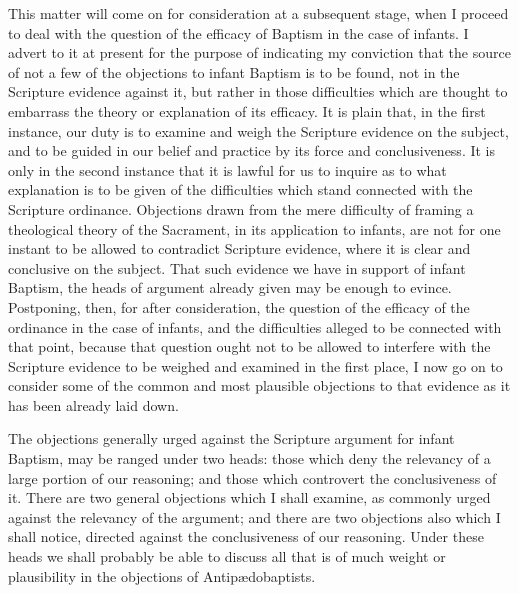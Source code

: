\documentclass[english,]{book}
\begin{document}
This matter will come on for consideration at a subsequent stage, when I proceed to deal with the question of the efficacy of Baptism in the case of infants. I advert to it at present for the purpose of indicating my conviction that the source of not a few of the objections to infant Baptism is to be found, not in the Scripture evidence against it, but rather in those difficulties which are thought to embarrass the theory or explanation of its efficacy. It is plain that, in the first instance, our duty is to examine and weigh the Scripture evidence on the subject, and to be guided in our belief and practice by its force and conclusiveness. It is only in the second instance that it is lawful for us to inquire as to what explanation is to be given of the difficulties which stand connected with the Scripture ordinance. Objections drawn from the mere difficulty of framing a theological theory of the Sacrament, in its application to infants, are not for one instant to be allowed to contradict Scripture evidence, where it is clear and conclusive on the subject. That such evidence we have in support of infant Baptism, the heads of argument already given may be enough to evince. Postponing, then, for after consideration, the question of the efficacy of the ordinance in the case of infants, and the difficulties alleged to be connected with that point, because that question ought not to be allowed to interfere with the Scripture evidence to be weighed and examined in the first place, I now go on to consider some of the common and most plausible objections to that evidence as it has been already laid down.

The objections generally urged against the Scripture argument for infant Baptism, may be ranged under two heads: those which deny the relevancy of a large portion of our reasoning; and those which controvert the conclusiveness of it. There are two general objections which I shall examine, as commonly urged against the relevancy of the argument; and there are two objections also which I shall notice, directed against the conclusiveness of our reasoning. Under these heads we shall probably be able to discuss all that is of much weight or plausibility in the objections of Antipædobaptists.
\end{document}
